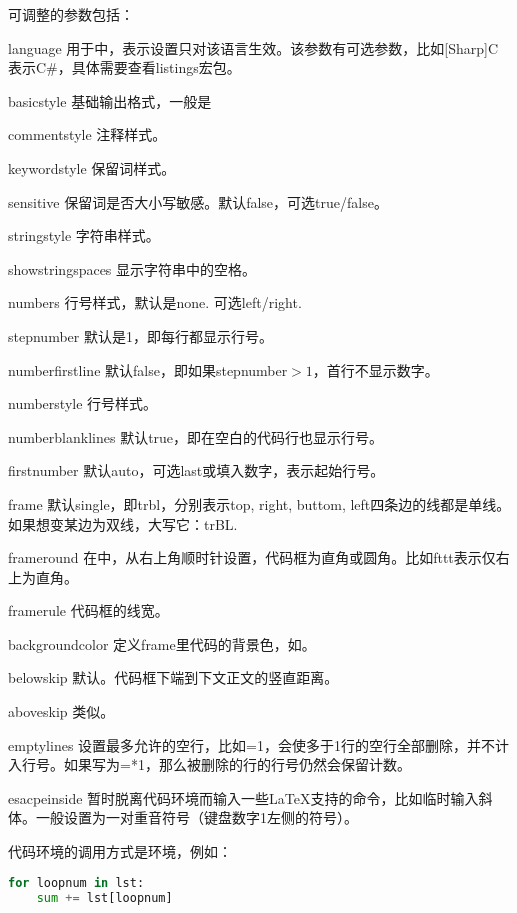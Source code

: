 可调整的参数包括：
\begin{para}
\item[language] 用于中，表示设置只对该语言生效。该参数有可选参数，比如[Sharp]C表示C\#，具体需要查看listings宏包。
\item[basicstyle] 基础输出格式，一般是
\item[commentstyle] 注释样式。
\item[keywordstyle] 保留词样式。
\item[sensitive] 保留词是否大小写敏感。默认false，可选true/false。
\item[stringstyle] 字符串样式。
\item[showstringspaces] 显示字符串中的空格。
\item[numbers] 行号样式，默认是none. 可选left/right.
\item[stepnumber] 默认是1，即每行都显示行号。
\item[numberfirstline] 默认false，即如果stepnumber$>1$，首行不显示数字。
\item[numberstyle] 行号样式。
\item[numberblanklines] 默认true，即在空白的代码行也显示行号。
\item[firstnumber] 默认auto，可选last或填入数字，表示起始行号。
\item[frame] 默认single，即trbl，分别表示top, right, buttom, left四条边的线都是单线。如果想变某边为双线，大写它：trBL.
\item[frameround] 在中，从右上角顺时针设置，代码框为直角或圆角。比如fttt表示仅右上为直角。
\item[framerule] 代码框的线宽。
\item[backgroundcolor] 定义frame里代码的背景色，如。
\item[belowskip] 默认。代码框下端到下文正文的竖直距离。
\item[aboveskip] 类似。
\item[emptylines] 设置最多允许的空行，比如=1，会使多于1行的空行全部删除，并不计入行号。如果写为=*1，那么被删除的行的行号仍然会保留计数。
\item[esacpeinside] 暂时脱离代码环境而输入一些\LaTeX 支持的命令，比如临时输入斜体。一般设置为一对重音符号（键盘数字1左侧的符号）。
\end{para}

代码环境的调用方式是环境，例如：
\begin{latex}
\begin{lstlisting}[language=Python]
for loopnum in lst:
    sum += lst[loopnum]
\end{lstlisting}
\end{latex}

